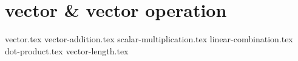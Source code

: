 \chapter{vector \& vector operation}
{vector.tex}
{vector-addition.tex}
{scalar-multiplication.tex}
{linear-combination.tex}
{dot-product.tex}
{vector-length.tex}